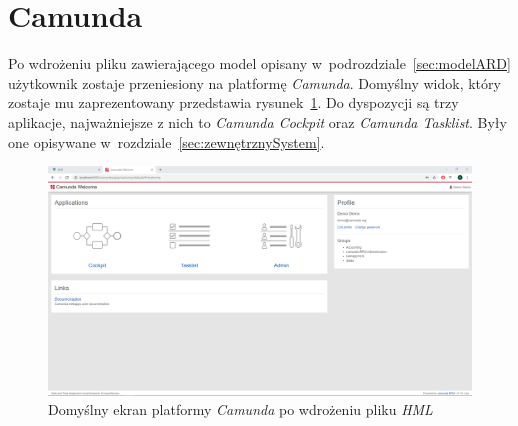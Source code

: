 \section{Camunda}
\label{sec:camunda}
Po wdrożeniu pliku zawierającego model opisany w~podrozdziale~\ref{sec:modelARD} użytkownik zostaje przeniesiony na platformę \emph{Camunda}. Domyślny widok, który zostaje mu zaprezentowany przedstawia rysunek~\ref{fig:camundaDefault}. Do dyspozycji są trzy aplikacje, najważniejsze z nich to \emph{Camunda Cockpit} oraz \emph{Camunda Tasklist}. Były one opisywane w~rozdziale~\ref{sec:zewnętrznySystem}.
\begin{figure}
    \centering
    \includegraphics[width=\textwidth]{./assets/camundaDefault.png}
    \caption{Domyślny ekran platformy \emph{Camunda} po wdrożeniu pliku \emph{HML}}
    \label{fig:camundaDefault}
\end{figure}

